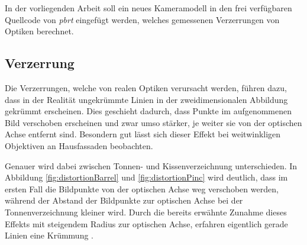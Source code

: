 In der vorliegenden Arbeit soll ein neues Kameramodell in den frei verfügbaren Quellcode von \textit{pbrt} eingefügt werden, welches gemessenen Verzerrungen von Optiken berechnet.

\subsection{Verzerrung}

Die Verzerrungen, welche von realen Optiken verursacht werden, führen dazu, dass in der Realität ungekrümmte Linien in der zweidimensionalen Abbildung gekrümmt erscheinen. Dies geschieht dadurch, dass Punkte im aufgenommenen Bild verschoben erscheinen und zwar umso stärker, je weiter sie von der optischen Achse entfernt sind. Besondern gut lässt sich dieser Effekt bei weitwinkligen Objektiven an Hausfassaden beobachten. 

Genauer wird dabei zwischen Tonnen- und Kissenverzeichnung unterschieden. In Abbildung \ref{fig:distortionBarrel} und \ref{fig:distortionPinc} wird deutlich, dass im ersten Fall die Bildpunkte von der optischen Achse weg verschoben werden, während der Abstand der Bildpunkte zur optischen Achse bei der Tonnenverzeichnung kleiner wird. Durch die bereits erwähnte Zunahme dieses Effekts mit steigendem Radius zur optischen Achse, erfahren eigentlich gerade Linien eine Krümmung \cite{smith2000modern}.

